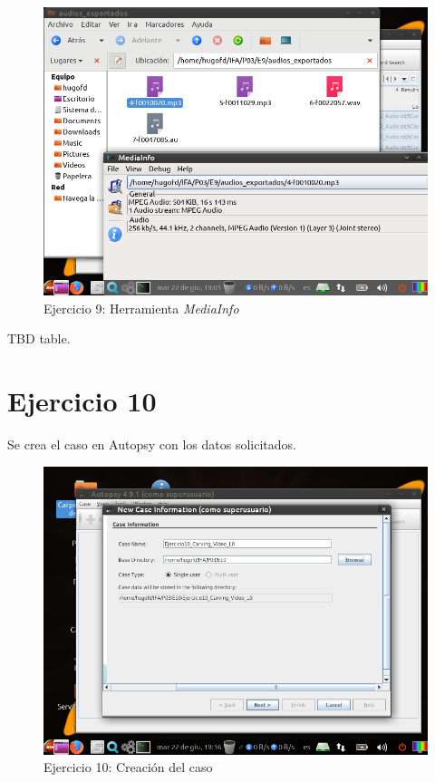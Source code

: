 \documentclass[11pt]{article}
\begin{document}
\begin{figure}[H]
    \caption{Ejercicio 9: Herramienta \textit{MediaInfo}}
    \centering
    \includegraphics[scale=0.7]{e9-6.png}
\end{figure}

TBD table.

\section{Ejercicio 10}
Se crea el caso en Autopsy con los datos solicitados.

\begin{figure}[H]
    \caption{Ejercicio 10: Creación del caso}
    \centering
    \includegraphics[scale=0.7]{e10-1.png}
\end{figure}
\end{document}
